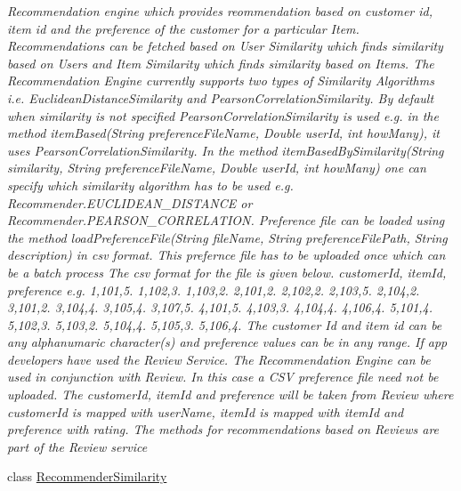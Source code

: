 \begin{DoxyCompactItemize}
\begin{DoxyCompactList}\small\item\em Recommendation engine which provides reommendation based on customer id, item id and the preference of the customer for a particular Item. Recommendations can be fetched based on User Similarity which finds similarity based on Users and Item Similarity which finds similarity based on Items. The Recommendation Engine currently supports two types of Similarity Algorithms i.\+e. Euclidean\+Distance\+Similarity and Pearson\+Correlation\+Similarity. By default when similarity is not specified Pearson\+Correlation\+Similarity is used e.\+g. in the method item\+Based(\+String preference\+File\+Name, Double   user\+Id, int  how\+Many), it uses Pearson\+Correlation\+Similarity. In the method item\+Based\+By\+Similarity(\+String similarity, String preference\+File\+Name, Double   user\+Id, int  how\+Many) one can specify which similarity algorithm has to be used e.\+g. Recommender.\+E\+U\+C\+L\+I\+D\+E\+A\+N\+\_\+\+D\+I\+S\+T\+A\+N\+C\+E or Recommender.\+P\+E\+A\+R\+S\+O\+N\+\_\+\+C\+O\+R\+R\+E\+L\+A\+T\+I\+O\+N. Preference file can be loaded using the method load\+Preference\+File(\+String file\+Name, String preference\+File\+Path, String description) in csv format. This prefernce file has to be uploaded once which can be a batch process The csv format for the file is given below. customer\+Id, item\+Id, preference e.\+g. 1,101,5. 1,102,3. 1,103,2. 2,101,2. 2,102,2. 2,103,5. 2,104,2. 3,101,2. 3,104,4. 3,105,4. 3,107,5. 4,101,5. 4,103,3. 4,104,4. 4,106,4. 5,101,4. 5,102,3. 5,103,2. 5,104,4. 5,105,3. 5,106,4. The customer Id and item id can be any alphanumaric character(s) and preference values can be in any range. If app developers have used the Review Service. The Recommendation Engine can be used in conjunction with Review. In this case a C\+S\+V preference file need not be uploaded. The customer\+Id, item\+Id and preference will be taken from Review where customer\+Id is mapped with user\+Name, item\+Id is mapped with item\+Id and preference with rating. The methods for recommendations based on Reviews are part of the Review service \end{DoxyCompactList}\item 
class \hyperlink{classcom_1_1shephertz_1_1app42_1_1paas_1_1sdk_1_1windows_1_1recommend_1_1_recommender_similarity}{Recommender\+Similarity}
\end{DoxyCompactItemize}
